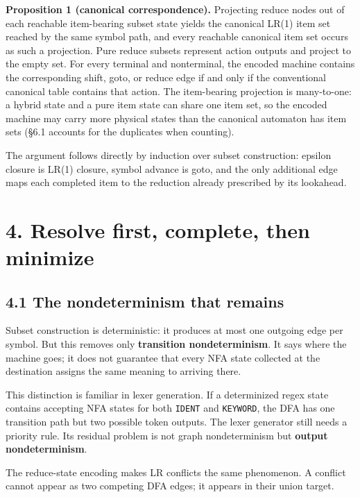 \documentclass[
  10pt,
]{article}
\begin{document}
\textbf{Proposition 1 (canonical correspondence).} Projecting reduce
nodes out of each reachable item-bearing subset state yields the
canonical LR(1) item set reached by the same symbol path, and every
reachable canonical item set occurs as such a projection. Pure reduce
subsets represent action outputs and project to the empty set. For every
terminal and nonterminal, the encoded machine contains the corresponding
shift, goto, or reduce edge if and only if the conventional canonical
table contains that action. The item-bearing projection is many-to-one:
a hybrid state and a pure item state can share one item set, so the
encoded machine may carry more physical states than the canonical
automaton has item sets (§6.1 accounts for the duplicates when
counting).

The argument follows directly by induction over subset construction:
epsilon closure is LR(1) closure, symbol advance is goto, and the only
additional edge maps each completed item to the reduction already
prescribed by its lookahead.

\hypertarget{4-resolve-first-complete-then-minimize}{%
\section{4. Resolve first, complete, then
minimize}\label{4-resolve-first-complete-then-minimize}}

\hypertarget{41-the-nondeterminism-that-remains}{%
\subsection{4.1 The nondeterminism that
remains}\label{41-the-nondeterminism-that-remains}}

Subset construction is deterministic: it produces at most one outgoing
edge per symbol. But this removes only \textbf{transition
nondeterminism}. It says where the machine goes; it does not guarantee
that every NFA state collected at the destination assigns the same
meaning to arriving there.

This distinction is familiar in lexer generation. If a determinized
regex state contains accepting NFA states for both \texttt{IDENT} and
\texttt{KEYWORD}, the DFA has one transition path but two possible token
outputs. The lexer generator still needs a priority rule. Its residual
problem is not graph nondeterminism but \textbf{output nondeterminism}.

The reduce-state encoding makes LR conflicts the same phenomenon. A
conflict cannot appear as two competing DFA edges; it appears in their
union target.
\end{document}
